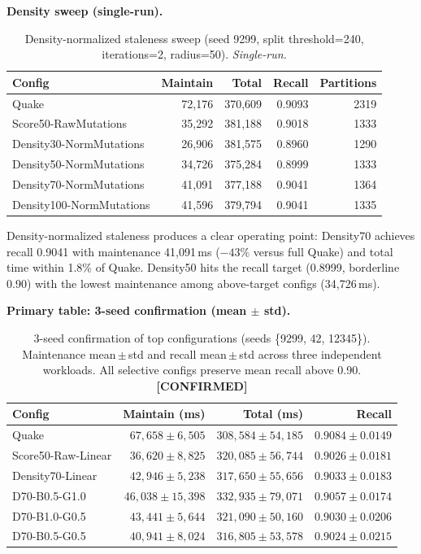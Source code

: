\documentclass[sigconf, nonacm]{acmart}
\begin{document}
\textbf{Density sweep (single-run).}
\begin{table}[h]
\centering
\caption{Density-normalized staleness sweep (seed 9299, split threshold=240,
  iterations=2, radius=50). \textit{Single-run.}}
\label{tab:density}
\begin{tabular}{lrrrr}
  \toprule
  Config & Maintain & Total & Recall & Partitions \\
  \midrule
  Quake                   & 72,176 & 370,609 & 0.9093 & 2319 \\
  Score50-RawMutations    & 35,292 & 381,188 & 0.9018 & 1333 \\
  Density30-NormMutations & 26,906 & 381,575 & 0.8960 & 1290 \\
  Density50-NormMutations & 34,726 & 375,284 & 0.8999 & 1333 \\
  Density70-NormMutations & 41,091 & 377,188 & 0.9041 & 1364 \\
  Density100-NormMutations& 41,596 & 379,794 & 0.9041 & 1335 \\
  \bottomrule
\end{tabular}
\end{table}

Density-normalized staleness produces a clear operating point:
Density70 achieves recall 0.9041 with maintenance 41,091\,ms
($-43\%$ versus full Quake) and total time within 1.8\% of Quake.
Density50 hits the recall target (0.8999, borderline 0.90) with
the lowest maintenance among above-target configs (34,726\,ms).

\textbf{Primary table: 3-seed confirmation (mean $\pm$ std).}
\begin{table}[h]
\centering
\caption{3-seed confirmation of top configurations
  (seeds \{9299, 42, 12345\}).
  Maintenance mean\,$\pm$\,std and recall mean\,$\pm$\,std across three
  independent workloads. All selective configs preserve mean recall
  above 0.90. \textbf{[CONFIRMED]}}
\label{tab:confirmation}
\begin{tabular}{lrrr}
  \toprule
  Config & Maintain (ms) & Total (ms) & Recall \\
  \midrule
  Quake
    & $67{,}658 \pm 6{,}505$
    & $308{,}584 \pm 54{,}185$
    & $0.9084 \pm 0.0149$ \\
  Score50-Raw-Linear
    & $36{,}620 \pm 8{,}825$
    & $320{,}085 \pm 56{,}744$
    & $0.9026 \pm 0.0181$ \\
  Density70-Linear
    & $42{,}946 \pm 5{,}238$
    & $317{,}650 \pm 55{,}656$
    & $0.9033 \pm 0.0183$ \\
  D70-B0.5-G1.0
    & $46{,}038 \pm 15{,}398$
    & $332{,}935 \pm 79{,}071$
    & $0.9057 \pm 0.0174$ \\
  D70-B1.0-G0.5
    & $43{,}441 \pm 5{,}644$
    & $321{,}090 \pm 50{,}160$
    & $0.9030 \pm 0.0206$ \\
  D70-B0.5-G0.5
    & $40{,}941 \pm 8{,}024$
    & $316{,}805 \pm 53{,}578$
    & $0.9024 \pm 0.0215$ \\
  \bottomrule
\end{tabular}
\end{table}
\end{document}
